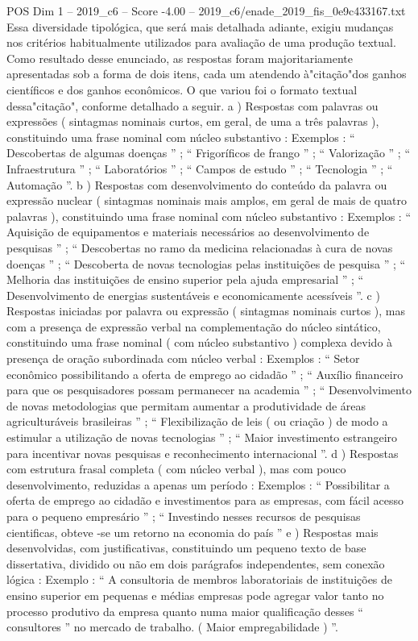 \begin{textsample}{POS Dim 1 – 2019\_c6 – Score -4.00 – 2019\_c6/enade\_2019\_fis\_0e9c433167.txt}
Essa diversidade tipológica, que será mais detalhada adiante, exigiu mudanças nos critérios habitualmente utilizados para avaliação de uma produção textual.
Como resultado desse enunciado, as respostas foram majoritariamente apresentadas sob a forma de dois itens, cada um atendendo à"citação"dos ganhos científicos e dos ganhos econômicos.
O que variou foi o formato textual dessa"citação", conforme detalhado a seguir. a ) Respostas com palavras ou expressões ( sintagmas nominais curtos, em geral, de uma a três palavras ), constituindo uma frase nominal com núcleo substantivo : Exemplos : “ Descobertas de algumas doenças ” ; “ Frigoríficos de frango ” ; “ Valorização ” ; “ Infraestrutura ” ; “ Laboratórios ” ; “ Campos de estudo ” ; “ Tecnologia ” ; “ Automação ”. b ) Respostas com desenvolvimento do conteúdo da palavra ou expressão nuclear ( sintagmas nominais mais amplos, em geral de mais de quatro palavras ), constituindo uma frase nominal com núcleo substantivo : Exemplos : “ Aquisição de equipamentos e materiais necessários ao desenvolvimento de pesquisas ” ; “ Descobertas no ramo da medicina relacionadas à cura de novas doenças ” ; “ Descoberta de novas tecnologias pelas instituições de pesquisa ” ; “ Melhoria das instituições de ensino superior pela ajuda empresarial ” ; “ Desenvolvimento de energias sustentáveis e economicamente acessíveis ”. c ) Respostas iniciadas por palavra ou expressão ( sintagmas nominais curtos ), mas com a presença de expressão verbal na complementação do núcleo sintático, constituindo uma frase nominal ( com núcleo substantivo ) complexa devido à presença de oração subordinada com núcleo verbal : Exemplos : “ Setor econômico possibilitando a oferta de emprego ao cidadão ” ; “ Auxílio financeiro para que os pesquisadores possam permanecer na academia ” ; “ Desenvolvimento de novas metodologias que permitam aumentar a produtividade de áreas agriculturáveis brasileiras ” ; “ Flexibilização de leis ( ou criação ) de modo a estimular a utilização de novas tecnologias ” ; “ Maior investimento estrangeiro para incentivar novas pesquisas e reconhecimento internacional ”. d ) Respostas com estrutura frasal completa ( com núcleo verbal ), mas com pouco desenvolvimento, reduzidas a apenas um período : Exemplos : “ Possibilitar a oferta de emprego ao cidadão e investimentos para as empresas, com fácil acesso para o pequeno empresário ” ; “ Investindo nesses recursos de pesquisas cientificas, obteve -se um retorno na economia do país ” e ) Respostas mais desenvolvidas, com justificativas, constituindo um pequeno texto de base dissertativa, dividido ou não em dois parágrafos independentes, sem conexão lógica : Exemplo : “ A consultoria de membros laboratoriais de instituições de ensino superior em pequenas e médias empresas pode agregar valor tanto no processo produtivo da empresa quanto numa maior qualificação desses “ consultores ” no mercado de trabalho. ( Maior empregabilidade ) ”.

\end{textsample}
